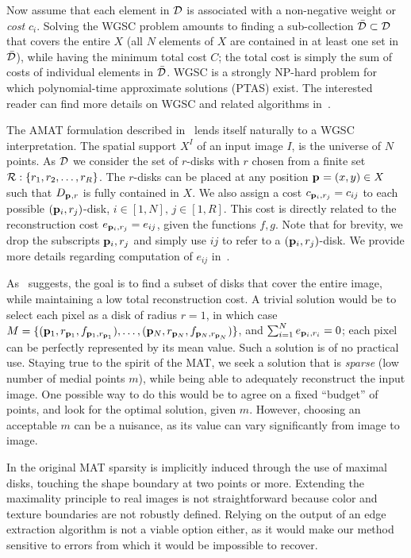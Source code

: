 \documentclass[10pt,twocolumn,letterpaper]{article}
\begin{document}
Now assume that each element in $\mathcal{D}$ is associated with a non-negative weight or \emph{cost} $c_i$.
Solving the WGSC problem amounts to finding a sub-collection $\bar{\mathcal{D}} \subset \mathcal{D}$ that covers the entire $X$
(all $N$ elements of $X$ are contained in at least one set in $\bar{\mathcal{D}}$), while having the minimum
total cost $C$; the total cost is simply the sum of costs of individual elements in $\bar{\mathcal{D}}$.
WGSC is a strongly NP-hard problem for which polynomial-time approximate solutions (PTAS) exist.
The interested reader can find more details on WGSC and related algorithms 
in~\cite{mustafa2015quasi,varadarajan2010weighted,har2012weighted,chan2012weighted}.

The AMAT formulation described in~ lends itself naturally to a 
WGSC interpretation.
The spatial support $X^I$ of an input image $I$, is the universe of $N$ points.
As $\mathcal{D}$ we consider the set of $r$-disks with $r$ chosen from a finite set $\mathcal{R}:\{r_1,r_2,\ldots,r_R\}$.
The $r$-disks can be placed at any position $\mathbf{p}_{}=(x,y)\in X$ such that $D_{\mathbf{p}_{},r}$ is fully contained in $X$.
We also assign a cost $c_{\mathbf{p}_{i},r_j} = c_{ij}$ to each possible $(\mathbf{p}_{i},r_j)$-disk, $i\in[1,N],\, j\in[1,R]$.
This cost is directly related to the reconstruction cost 
$e_{\mathbf{p}_{i},r_j} = e_{ij}$, given the functions $f,g$.
Note that for brevity, we drop the subscripts $\mathbf{p}_{i},r_j$ and simply use $ij$ to refer to a $(\mathbf{p}_{i},r_j)$-disk.
We provide more details regarding computation of $e_{ij}$ in~.

As~ suggests, the goal is to find a subset of disks that cover the entire image, while maintaining
a low total reconstruction cost. 
A trivial solution would be to select each pixel as a disk of radius $r=1$, in which case
$M=\{ (\mathbf{p}_{1},r_{\mathbf{p}_{1}},f_{\mathbf{p}_{1},r_{\mathbf{p}_{1}}}), \ldots, ( \mathbf{p}_{N},r_{\mathbf{p}_{N}},f_{\mathbf{p}_{N},r_{\mathbf{p}_{N}}} ) \}$,
and $\sum_{i=1}^N e_{\mathbf{p}_{i},r_i} = 0$; each pixel can be perfectly represented by its mean value.
Such a solution is of no practical use. 
Staying true to the spirit of the MAT, we seek a solution that is \emph{sparse}
(low number of medial points $m$), while being able to adequately reconstruct the input image.
One possible way to do this would be to agree on a fixed ``budget'' of points, and look for the 
optimal solution, given $m$.
However, choosing an acceptable $m$ can be a nuisance, as its value can vary significantly  from image to image.

In the original MAT sparsity is implicitly induced through the use of maximal disks,
touching the shape boundary at two points or more.
Extending the maximality principle to real images is not straightforward
because color and texture boundaries are not robustly defined.
Relying on the output of an edge extraction algorithm is not a viable option either,
as it would make our method sensitive to errors from which it would be impossible to recover.
\end{document}

